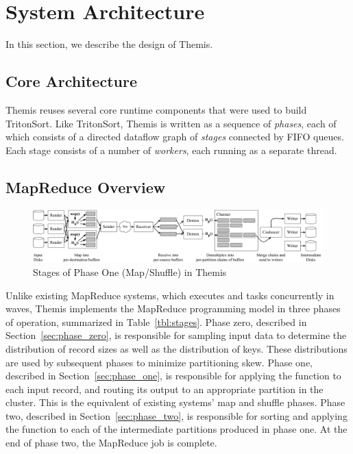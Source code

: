 \section{System Architecture}
\label{themis:sec:design}

In this section, we describe the design of Themis.

\subsection{Core Architecture}
\label{sec:overview}

Themis reuses several core runtime components that were used to build
TritonSort.  Like TritonSort, Themis is written as a sequence of
\emph{phases}, each of which consists of a directed dataflow graph of
\emph{stages} connected by FIFO queues.  Each stage consists of a number of
\emph{workers}, each running as a separate thread.

\subsection{MapReduce Overview}

\begin{figure}
\centering
\includegraphics[width=\textwidth]{themis/figures/detailed_phase_one.pdf}
\caption{\label{themis:fig:phase_one} Stages of Phase One (Map/Shuffle) in Themis}
\end{figure}

Unlike existing MapReduce systems, which executes \map and \reduce tasks
concurrently in waves, Themis implements the MapReduce programming model in
three phases of operation, summarized in Table~\ref{tbl:stages}.  Phase zero,
described in Section~\ref{sec:phase_zero}, is responsible for sampling input
data to determine the distribution of record sizes as well as the distribution
of keys.  These distributions are used by subsequent phases to minimize
partitioning skew.  Phase one, described in Section~\ref{sec:phase_one}, is
responsible for applying the \map function to each input record, and routing
its output to an appropriate partition in the cluster.  This is the equivalent
of existing systems' map and shuffle phases.  Phase two, described in
Section~\ref{sec:phase_two}, is responsible for sorting and applying the
\reduce function to each of the intermediate partitions produced in phase one.
At the end of phase two, the MapReduce job is complete.

